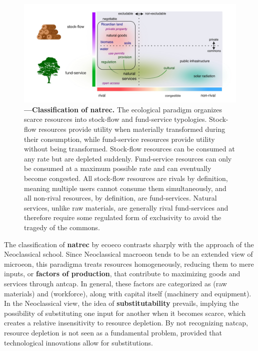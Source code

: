 \documentclass[./main_en.tex]{subfiles}
\begin{document}
\begin{figure}[t!] 
\centering				
\includegraphics[width=0.98\linewidth]{figs/fig_natrec_en.jpg}		
\caption[Classification of Natural Resources]
{\textbf{---\;Classification of \gls{natrec}.}
    The ecological paradigm organizes scarce resources into stock-flow and fund-service typologies. Stock-flow resources provide utility when materially transformed during their consumption, while fund-service resources provide utility without being transformed. Stock-flow resources can be consumed at any rate but are depleted suddenly. Fund-service resources can only be consumed at a maximum possible rate and can eventually become congested. All stock-flow resources are rivals by definition, meaning multiple users cannot consume them simultaneously, and all non-rival resources, by definition, are fund-services. Natural services, unlike raw materials, are generally rival fund-services and therefore require some regulated form of exclusivity to avoid the tragedy of the commons.
}
\label{fig:eco:natrec} 		
\end{figure}

\par The classification of \textbf{\gls{natrec}} by \gls{ecoeco} contrasts sharply with the approach of the Neoclassical school. Since Neoclassical \gls{macroeon} tends to be an extended view of \gls{microeon}, this \gls{paradigma} treats resources homogeneously, reducing them to mere inputs, or \textbf{factors of production}, that contribute to maximizing goods and services through \gls{antcap}. In general, these factors are categorized as  (raw materials) and  (workforce), along with capital itself (machinery and equipment). In the Neoclassical view, the idea of \textbf{substitutability} prevails, implying the possibility of substituting one input for another when it becomes scarce, which creates a relative insensitivity to resource depletion. By not recognizing \gls{natcap}, resource depletion is not seen as a fundamental problem, provided that technological innovations allow for substitutions.
\end{document}
